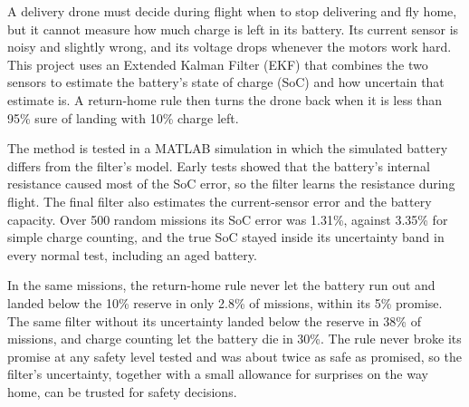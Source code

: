 
A delivery drone must decide during flight when to stop delivering and fly home, but it cannot measure how much charge is left in its battery. Its current sensor is noisy and slightly wrong, and its voltage drops whenever the motors work hard. This project uses an Extended Kalman Filter (EKF) that combines the two sensors to estimate the battery's state of charge (SoC) and how uncertain that estimate is. A return-home rule then turns the drone back when it is less than 95\% sure of landing with 10\% charge left.

The method is tested in a MATLAB simulation in which the simulated battery differs from the filter's model. Early tests showed that the battery's internal resistance caused most of the SoC error, so the filter learns the resistance during flight. The final filter also estimates the current-sensor error and the battery capacity. Over 500 random missions its SoC error was 1.31\%, against 3.35\% for simple charge counting, and the true SoC stayed inside its uncertainty band in every normal test, including an aged battery.

In the same missions, the return-home rule never let the battery run out and landed below the 10\% reserve in only 2.8\% of missions, within its 5\% promise. The same filter without its uncertainty landed below the reserve in 38\% of missions, and charge counting let the battery die in 30\%. The rule never broke its promise at any safety level tested and was about twice as safe as promised, so the filter's uncertainty, together with a small allowance for surprises on the way home, can be trusted for safety decisions.
